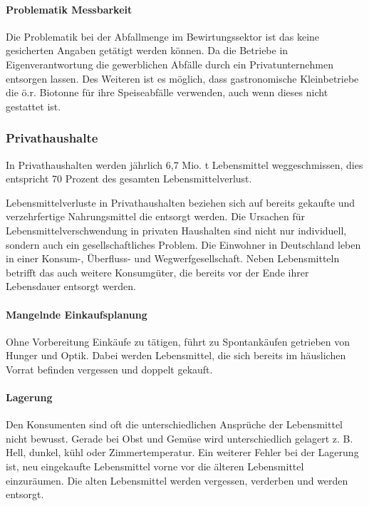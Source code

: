 \begin{itemize}
  \paragraph{Problematik Messbarkeit}
Die Problematik bei der Abfallmenge im Bewirtungssektor ist das keine gesicherten Angaben getätigt werden können. Da die Betriebe in Eigenverantwortung die gewerblichen Abfälle durch ein Privatunternehmen entsorgen lassen. Des Weiteren ist es möglich, dass gastronomische Kleinbetriebe die ö.r. Biotonne für ihre Speiseabfälle verwenden, auch wenn dieses nicht gestattet ist. %

\end{itemize}


\subsubsection{Privathaushalte}
In Privathaushalten werden jährlich 6,7 Mio. t Lebensmittel weggeschmissen, dies entspricht 70 Prozent des gesamten Lebensmittelverlust. %



Lebensmittelverluste in Privathaushalten beziehen sich auf bereits gekaufte und verzehrfertige Nahrungsmittel die entsorgt werden. %
Die Ursachen für Lebensmittelverschwendung in privaten Haushalten sind nicht nur individuell, sondern auch ein gesellschaftliches Problem. Die Einwohner in Deutschland leben in einer Konsum-, Überfluss- und Wegwerfgesellschaft. Neben Lebensmitteln betrifft das auch weitere Konsumgüter, die bereits vor der Ende ihrer Lebensdauer entsorgt werden. %

\paragraph{Mangelnde Einkaufsplanung}
Ohne Vorbereitung Einkäufe zu tätigen, führt zu Spontankäufen getrieben von Hunger und Optik. Dabei werden Lebensmittel, die sich bereits im häuslichen Vorrat befinden vergessen und doppelt gekauft. %

\paragraph{Lagerung}
Den Konsumenten sind oft die unterschiedlichen Ansprüche der Lebensmittel nicht bewusst. Gerade bei Obst und Gemüse wird unterschiedlich gelagert z. B. Hell, dunkel, kühl oder Zimmertemperatur. Ein weiterer Fehler bei der Lagerung ist, neu eingekaufte Lebensmittel vorne vor die älteren Lebensmittel einzuräumen. Die alten Lebensmittel werden vergessen, verderben und werden entsorgt. %

